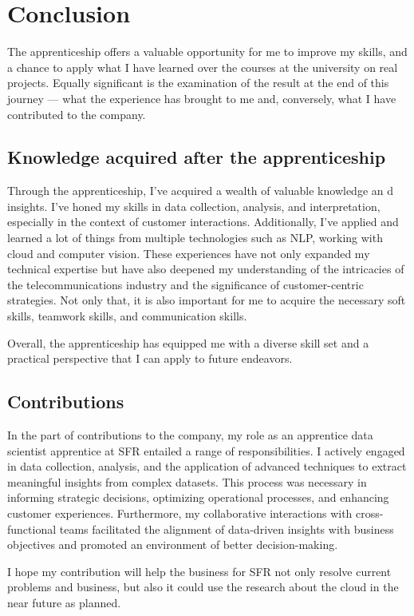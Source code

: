 \chapter{Conclusion}

\startcontents[chapters]
\printmyminitoc{
}

The apprenticeship offers a valuable opportunity for me to improve my skills, and a chance to apply what I have learned over the courses at the university on real projects. Equally significant is the examination of the result at the end of this journey — what the experience has brought to me and, conversely, what I have contributed to the company.

\section{Knowledge acquired after the apprenticeship}

Through the apprenticeship, I've acquired a wealth of valuable knowledge an
d insights. I've honed my skills in data collection, analysis, and interpretation, especially in the context of customer interactions. Additionally, I've applied and learned a lot of things from multiple technologies such as NLP, working with cloud and computer vision. These experiences have not only expanded my technical expertise but have also deepened my understanding of the intricacies of the telecommunications industry and the significance of customer-centric strategies. Not only that, it is also important for me to acquire the necessary soft skills, teamwork skills, and communication skills.

Overall, the apprenticeship has equipped me with a diverse skill set and a practical perspective that I can apply to future endeavors.


\section{Contributions}

In the part of contributions to the company, my role as an apprentice data scientist apprentice at SFR entailed a range of responsibilities. I actively engaged in data collection, analysis, and the application of advanced techniques to extract meaningful insights from complex datasets. This process was necessary in informing strategic decisions, optimizing operational processes, and enhancing customer experiences. Furthermore, my collaborative interactions with cross-functional teams facilitated the alignment of data-driven insights with business objectives and promoted an environment of better decision-making. 

I hope my contribution will help the business for SFR not only resolve current problems and business, but also it could use the research about the cloud in the near future as planned.



